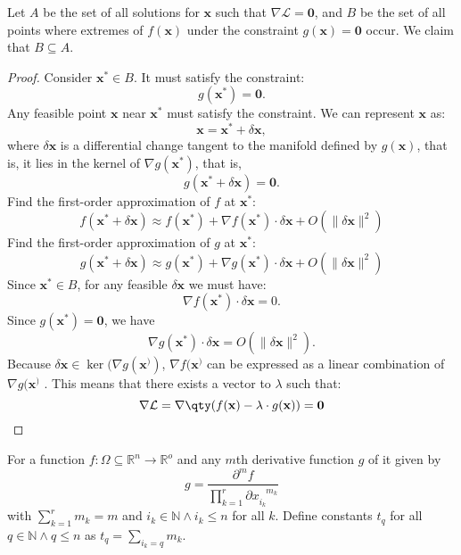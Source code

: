 \documentclass[a4paper,12pt]{report}
\begin{document}
\begin{itemize}
\begin{itemize}
 Let $A$ be the set of all solutions for \( \mathbf{x} \) such that $\nabla \mathcal{L} = \mathbf{0}$, and $B$ be the set of all points where extremes of \( f(\mathbf{x}) \) under the constraint \( g(\mathbf{x}) = \mathbf{0}\) occur. We claim that $B\subseteq A$.
\begin{proof}
Consider $\mathbf{x}^*\in B$. It must satisfy the constraint:
\[g(\mathbf{x}^*) = \mathbf{0}.\]
Any feasible point $\mathbf{x}$ near $\mathbf{x}^*$ must satisfy the constraint. We can represent $\mathbf{x}$ as:
\[\mathbf{x} = \mathbf{x}^* + \delta\mathbf{x},\]
where $\delta\mathbf{x}$ is a differential change tangent to the manifold defined by $g(\mathbf{x})$, that is, it lies in the kernel of $\nabla g(\mathbf{x}^*)$, that is,
\[g(\mathbf{x}^* + \delta\mathbf{x}) = \mathbf{0}.\]
Find the first-order approximation of $f$ at $\mathbf{x}^*$:
\[f(\mathbf{x}^*+ \delta\mathbf{x}) \approx f(\mathbf{x}^*) + \nabla f(\mathbf{x}^*) \cdot \delta\mathbf{x} + O(\|\delta\mathbf{x}\|^2)\]
Find the first-order approximation of $g$ at $\mathbf{x}^*$:
\[g(\mathbf{x}^*+ \delta\mathbf{x}) \approx g(\mathbf{x}^*) + \nabla g(\mathbf{x}^*) \cdot \delta\mathbf{x} + O(\|\delta\mathbf{x}\|^2)\]
Since $\mathbf{x}^*\in B$, for any feasible $\delta\mathbf{x}$ we must have:
\[\nabla f(\mathbf{x}^*) \cdot \delta\mathbf{x} = 0.\]
Since $g(\mathbf{x}^*) = \mathbf{0}$, we have
\[\nabla g(\mathbf{x}^*) \cdot \delta\mathbf{x} = O(\|\delta\mathbf{x}\|^2).\]
Because \( \delta\mathbf{x} \in \ker(\nabla g(\mathbf{x}^)) \), \( \nabla f(\mathbf{x}^) \) can be expressed as a linear combination of \( \nabla g(\mathbf{x}^) \) . This means that there exists a vector to $\lambda$ such that:
\[\nabla\mathcal{L} = \nabla \qty(f(\mathbf{x}) - \lambda \cdot g(\mathbf{x})) = \mathbf{0} \]
\end{proof}
For a function $f\colon\Omega\subseteq\mathbb{R}^n\to\mathbb{R}^o$ and any $m$th derivative function $g$ of it given by
\[g=\frac{\partial^mf}{\prod_{k=1}^r\partial x_{i_k}^{\phantom{i_k}m_k}}\]
with $\sum_{k=1}^rm_k=m$ and $i_k\in\mathbb{N}\land i_k\leq n$ for all $k$. Define constants $t_q$ for all $q\in\mathbb{N}\land q\leq n$ as $t_q=\sum_{i_k=q}m_k$. 


\end{itemize}
\end{itemize}
\end{document}
